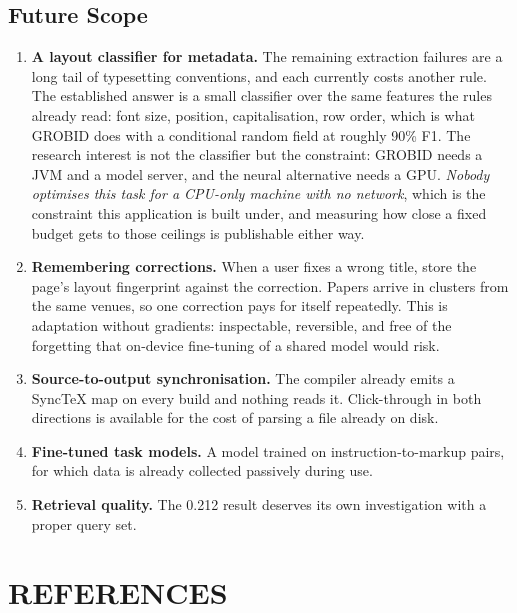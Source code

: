 \documentclass[12pt,a4paper]{report}
\begin{document}
\section{Future Scope}

\begin{enumerate}[leftmargin=*]
  \item \textbf{A layout classifier for metadata.} The remaining extraction
        failures are a long tail of typesetting conventions, and each currently
        costs another rule. The established answer is a small classifier over
        the same features the rules already read: font size, position,
        capitalisation, row order, which is what GROBID does with a
        conditional random field at roughly 90\% F1. The research interest is
        not the classifier but the constraint: GROBID needs a JVM and a model
        server, and the neural alternative needs a GPU. \emph{Nobody optimises
        this task for a CPU-only machine with no network}, which is the
        constraint this application is built under, and measuring how close a
        fixed budget gets to those ceilings is publishable either way.
  \item \textbf{Remembering corrections.} When a user fixes a wrong title, store
        the page's layout fingerprint against the correction. Papers arrive in
        clusters from the same venues, so one correction pays for itself
        repeatedly. This is adaptation without gradients: inspectable,
        reversible, and free of the forgetting that on-device fine-tuning of a
        shared model would risk.
  \item \textbf{Source-to-output synchronisation.} The compiler already emits a
        SyncTeX map on every build and nothing reads it. Click-through in both
        directions is available for the cost of parsing a file already on disk.
  \item \textbf{Fine-tuned task models.} A model trained on instruction-to-markup
        pairs, for which data is already collected passively during use.
  \item \textbf{Retrieval quality.} The 0.212 result deserves its own
        investigation with a proper query set.
\end{enumerate}

\chapter*{REFERENCES}
\end{document}
